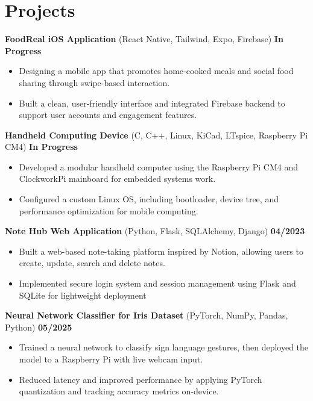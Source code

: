 \documentclass[letterpaper,11pt]{article}
\begin{document}
\section*{Projects}
\textbf{FoodReal iOS Application} (React Native, Tailwind, Expo, Firebase) \hfill \textbf{In Progress}
\begin{itemize}
    \item Designing a mobile app that promotes home-cooked meals and social food sharing through swipe-based interaction.
    \item Built a clean, user-friendly interface and integrated Firebase backend to support user accounts and engagement features.
\end{itemize}
\vspace{4mm}
\textbf{Handheld Computing Device} (C, C++, Linux, KiCad, LTspice, Raspberry Pi CM4) \hfill \textbf{In Progress}
\begin{itemize}
    \item Developed a modular handheld computer using the Raspberry Pi CM4 and ClockworkPi mainboard for embedded systems
work.
    \item Configured a custom Linux OS, including bootloader, device tree, and performance optimization for mobile computing.
\end{itemize}
\vspace{4mm}
\textbf{Note Hub Web Application} (Python, Flask, SQLAlchemy, Django) \hfill \textbf{04/2023}
\begin{itemize}
    \item Built a web-based note-taking platform inspired by Notion, allowing users to create, update, search and delete notes.
    \item Implemented secure login system and session management using Flask and SQLite for lightweight deployment
\end{itemize}
\vspace{4mm}
\textbf{Neural Network Classifier for Iris Dataset} (PyTorch, NumPy, Pandas, Python) \hfill \textbf{05/2025}
\begin{itemize}
    \item Trained a neural network to classify sign language gestures, then deployed the model to a Raspberry Pi with live webcam
input.
    \item Reduced latency and improved performance by applying PyTorch quantization and tracking accuracy metrics on-device.
\end{itemize}
\vspace{4mm}
\end{document}
